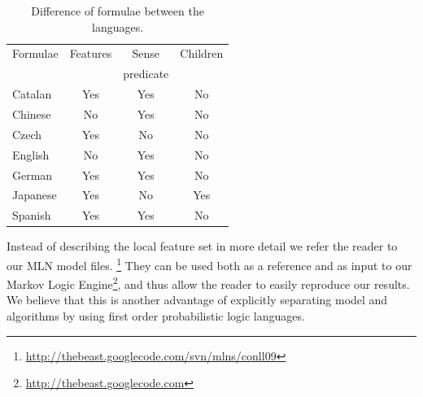 \begin{table}
\begin{center}
\small
\begin{tabular}{|l|c|c|c|}\hline
Formulae        & Features   & Sense  & Children  \\
                &                     & predicate   \\\hline\hline
Catalan         &   Yes      &  Yes   &  No  \\
Chinese         &   No       &  Yes   &  No  \\
Czech           &   Yes      &  No    &  No  \\
English         &   No       &  Yes   &  No  \\
German          &   Yes      &  Yes   &  No  \\
Japanese        &   Yes      &  No    &  Yes \\
Spanish         &   Yes      &  Yes   &  No  \\
\hline
\end{tabular}
\caption{Difference of formulae between the languages.}
\label{tbl:results}
\normalsize
\end{center}
\end{table}

Instead of describing the local feature set in more detail we refer the reader 
to our MLN model files.  
\footnote{\url{http://thebeast.googlecode.com/svn/mlns/conll09}} They can be 
used both as a reference and as input to our Markov Logic 
Engine\footnote{\url{http://thebeast.googlecode.com}}, and thus allow the reader 
to easily reproduce our results. We believe that this is another advantage of 
explicitly separating model and algorithms by using first order probabilistic 
logic languages.

